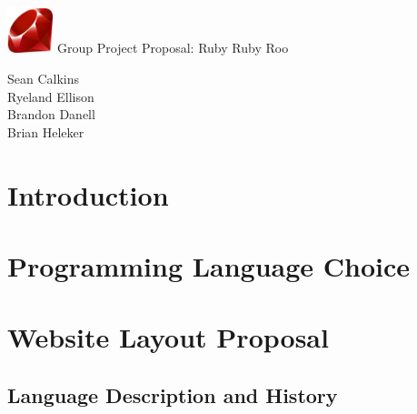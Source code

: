 \documentclass{article}
\begin{document}
\begin{titlepage}
  \centering %
  \vspace*{\fill} %
  
  \includegraphics[width=0.1\textwidth]{./ruby.png}
  \Huge Group Project Proposal: Ruby Ruby Roo

  \Large Sean Calkins \\
  \Large Ryeland Ellison \\
  \Large Brandon Danell \\
  \Large Brian Heleker

  \date{}
  
  \vspace*{\fill} %
\end{titlepage}




\section{Introduction}
 \cite{yamauchi-nakano-funakoshi:2013:SIGDIAL}

\section{Programming Language Choice}

\section{Website Layout Proposal}

\subsection{Language Description and History}
\end{document}
